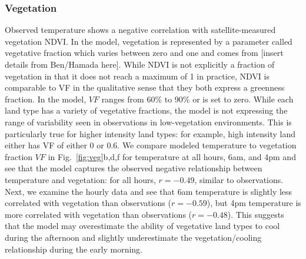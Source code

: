 \documentclass[draft,linenumbers]{agujournal}
\begin{document}
\subsubsection{Vegetation}
Observed temperature shows a negative correlation with satellite-measured vegetation NDVI. In the model, vegetation is represented by a parameter called vegetative fraction which varies between zero and one and comes from [insert details from Ben/Hamada here]. 
While NDVI is not explicitly a fraction of vegetation in that it does not reach a maximum of 1 in practice, NDVI is comparable to VF in the qualitative sense that they both express a greenness fraction. In the model, $VF$ ranges from 60\% to 90\% or is set to zero. While each land type has a variety of vegetative fractions, the model is not expressing the range of variability seen in observations in low-vegetation environments. This is particularly true for higher intensity land types: for example, high intensity land either has VF of either 0 or 0.6. 
We compare modeled temperature to vegetation fraction $VF$ in Fig.~\ref{fig:veg}b,d,f for temperature at all hours, 6am, and 4pm and see that
the model captures the observed negative relationship between temperature and vegetation: for all hours, $r= -0.49$, similar to observations. Next, we examine the hourly data and see that 6am temperature is slightly less correlated with vegetation than observations ($r= -0.59$), but 4pm temperature is more correlated with vegetation than observations ($r= -0.48$). This suggests that the model may overestimate the ability of vegetative land types to cool during the afternoon and slightly underestimate the vegetation/cooling relationship during the early morning. 

\end{document}
